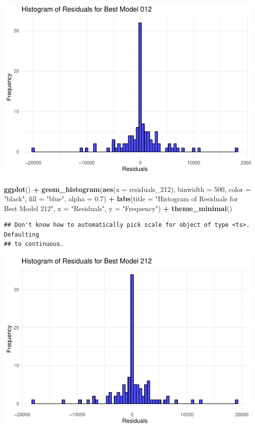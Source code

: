 \documentclass[
]{book}
\newenvironment{Shaded}{\begin{snugshade}}{\end{snugshade}}
\newcommand{\AttributeTok}[1]{\textcolor[rgb]{0.13,0.29,0.53}{#1}}
\newcommand{\DecValTok}[1]{\textcolor[rgb]{0.00,0.00,0.81}{#1}}
\newcommand{\FloatTok}[1]{\textcolor[rgb]{0.00,0.00,0.81}{#1}}
\newcommand{\FunctionTok}[1]{\textcolor[rgb]{0.13,0.29,0.53}{\textbf{#1}}}
\newcommand{\NormalTok}[1]{#1}
\newcommand{\SpecialCharTok}[1]{\textcolor[rgb]{0.81,0.36,0.00}{\textbf{#1}}}
\newcommand{\StringTok}[1]{\textcolor[rgb]{0.31,0.60,0.02}{#1}}
\begin{document}
\includegraphics{bookdown-demo_files/figure-latex/unnamed-chunk-49-1.pdf}

\begin{Shaded}
\begin{Highlighting}[]
\FunctionTok{ggplot}\NormalTok{() }\SpecialCharTok{+}
  \FunctionTok{geom\_histogram}\NormalTok{(}\FunctionTok{aes}\NormalTok{(}\AttributeTok{x =}\NormalTok{ residuals\_212), }\AttributeTok{binwidth =} \DecValTok{500}\NormalTok{, }\AttributeTok{color =} \StringTok{"black"}\NormalTok{, }\AttributeTok{fill =} \StringTok{"blue"}\NormalTok{, }\AttributeTok{alpha =} \FloatTok{0.7}\NormalTok{) }\SpecialCharTok{+}
  \FunctionTok{labs}\NormalTok{(}\AttributeTok{title =} \StringTok{"Histogram of Residuals for Best Model 212"}\NormalTok{, }\AttributeTok{x =} \StringTok{"Residuals"}\NormalTok{, }\AttributeTok{y =} \StringTok{"Frequency"}\NormalTok{) }\SpecialCharTok{+}
  \FunctionTok{theme\_minimal}\NormalTok{()}
\end{Highlighting}
\end{Shaded}

\begin{verbatim}
## Don't know how to automatically pick scale for object of type <ts>. Defaulting
## to continuous.
\end{verbatim}

\includegraphics{bookdown-demo_files/figure-latex/unnamed-chunk-49-2.pdf}
\end{document}
